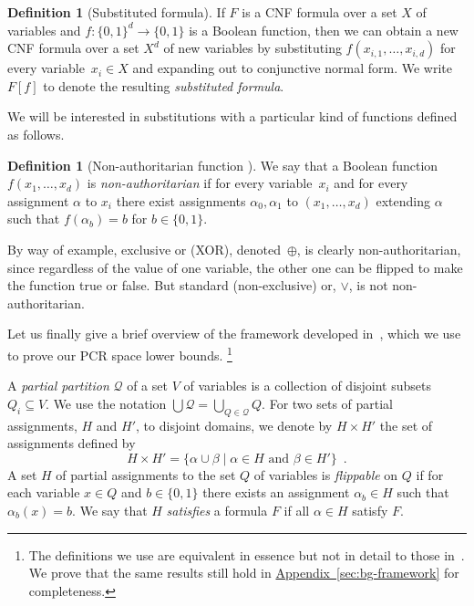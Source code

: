 \documentclass[11pt]{article}
\numberwithin{equation}{section}
\theoremstyle{definition}
\newtheorem{definition}[theorem]{Definition}
\theoremstyle{plain}
\newcommand{\expref}[2]{\hyperref[#2]{#1~\ref{#2}}}
\theoremstyle{plain}
\theoremstyle{definition}
\newcommand{\refapp}[1]{\expref{Appendix}{#1}}
\newcommand{\funcdescr}[3]{\ensuremath{ #1 : #2 \to #3}}
\newcommand{\set}[1]{\{ #1 \}}
\newcommand{\setdescr}[3][\mid]{\set{ #2 #1 #3 }}
\newcommand{\union}{\cup}
\newcommand{\Union}{\bigcup}
\newcommand{\introduceterm}[1]{{\emph{#1}}}
\newcommand{\eqperiod}{\enspace .}
\newcommand{\pebdeg}{\ensuremath{d}}
\newcommand{\substform}[2]{{#1}[{#2}]}
\newcommand{\xor}{\oplus}
\newcommand{\flippable}{flippable\xspace}
\newcommand{\partitionnot}{\mathcal{Q}}
\newcommand{\nonauthor}{non-author\-i\-tar\-ian\xspace}
\newcommand{\Nonauthor}{Non-authoritarian\xspace}
\begin{document}
%
%
%
%
%
%
%
%

\begin{definition}[Substituted formula]
  \label{def:substituted-formula}
If $F$ is a CNF formula over a set %
$X$ of variables  %
and
$\funcdescr{f}{\set{0, 1}^{\pebdeg}}{\set{0, 1}}$
is a Boolean function, then 
we can obtain a new CNF formula over a set
%
$X^{\pebdeg}$ of new variables  %
by
%
substituting $f(x_{i,1}, \ldots, x_{i,\pebdeg})$ for every variable~$x_i\in X$
%
%
%
%
and expanding out to conjunctive normal form. We write 
$\substform{F}{f}$   %
%
to denote the resulting \introduceterm{substituted formula}. %
\end{definition}
We will be
interested in substitutions with a
particular kind of functions defined as follows.

\begin{definition}[\Nonauthor{} function
  \cite{BN11UnderstandingSpace}]
  \label{def:nonauth-func}
  We say that
  a Boolean function $f(x_1, \ldots, x_{\pebdeg})$ is
  \introduceterm{\nonauthor{}} if for every
  variable~$x_i$ %
  and for every
  assignment $\alpha$ to
  $x_i$ there exist %
%
assignments  %
$\alpha_0, \alpha_1$
to $(x_1,\dots,x_{\pebdeg})$   %
%
%
%
%
extending $\alpha$ such that $f(\alpha_b) = b$ for $b \in \set{0, 1}$.
\end{definition}

By way of example, exclusive or (XOR), denoted~$\xor$, 
is clearly \nonauthor, since regardless of the
value of one variable, the other one can be flipped to make the
function true or false.  %
%
But standard (non-exclusive) or, $\lor$, is not non-authoritarian.  %
%
%
%
%

%
%
Let us finally give a brief overview of the framework developed
in~\cite{BG15Framework},
which we use to prove our PCR space lower bounds.%
%
%
%
%
%
%
\footnote{The definitions we use are equivalent in essence but not in detail to those in~\cite{BG15Framework}.
%
%
%
%
We prove that the same results still hold in
%
%
\refapp{sec:bg-framework}   %
    for completeness.}

A \introduceterm{partial partition}
$\partitionnot$ of a
%
set $V$ of variables  %
is a collection of disjoint %
subsets  %
$Q_i\subseteq V$. 
We use the notation $\Union \partitionnot =
%
%
\Union_{Q\in\partitionnot} Q$. %
For two sets of partial
assignments, $H$ and $H'$, %
to disjoint domains, we denote by $H \times H'$ the set of 
assignments %
%
%
%
defined by \[ H \times H' = \setdescr{\alpha \union
  \beta}{\alpha \in H \text{\ and\ } \beta \in H'} \eqperiod\] %
A set %
$H$ of partial assignments  %
to the %
%
set $Q$ of variables  %
is
\introduceterm{\flippable{}} on $Q$ if for each
variable $x \in Q$ and $b \in \set{0, 1}$ there exists an assignment
$\alpha_b \in H$ such that $\alpha_b(x) = b$. 
%
We say that
$H$ \introduceterm{satisfies} a formula $F$ if all 
$\alpha \in H$
%
satisfy $F$.
\end{document}
